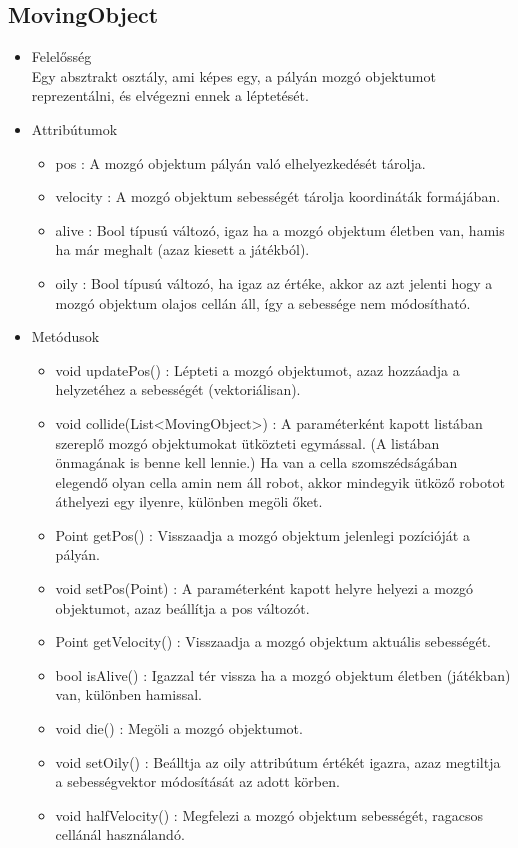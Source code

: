\subsection{MovingObject}
\begin{itemize}
	\item Felelősség\\
	Egy absztrakt osztály, ami képes egy, a pályán mozgó objektumot reprezentálni, és elvégezni ennek a léptetését.
	\item Attribútumok
	\begin{itemize}
		\item pos : A mozgó objektum  pályán való elhelyezkedését tárolja.
		\item velocity : A mozgó objektum sebességét tárolja koordináták formájában.
		\item alive : Bool típusú változó, igaz ha a mozgó objektum életben van, hamis ha már meghalt (azaz kiesett a játékból).
		\item oily : Bool típusú változó, ha igaz az értéke, akkor az azt jelenti hogy a mozgó objektum olajos cellán áll, így a sebessége nem módosítható.
	\end{itemize}
	\item Metódusok
	\begin{itemize}
		\item void updatePos() : Lépteti a mozgó objektumot, azaz hozzáadja a helyzetéhez a sebességét (vektoriálisan).
		\item void collide(List<MovingObject>) : A paraméterként kapott listában szereplő mozgó objektumokat ütközteti egymással. (A listában önmagának is benne kell lennie.) Ha van a cella szomszédságában elegendő olyan cella amin nem áll robot, akkor mindegyik ütköző robotot áthelyezi egy ilyenre, különben megöli őket.
		\item Point getPos() : Visszaadja a mozgó objektum jelenlegi pozícióját a pályán.
		\item void setPos(Point) : A paraméterként kapott helyre helyezi a mozgó objektumot, azaz beállítja a pos változót.
		\item Point getVelocity() : Visszaadja a mozgó objektum aktuális sebességét.
		\item bool isAlive() : Igazzal tér vissza ha a mozgó objektum életben (játékban) van, különben hamissal.
		\item void die() : Megöli a mozgó objektumot.
		\item void setOily() : Beálltja az oily attribútum értékét igazra, azaz megtiltja a sebességvektor módosítását az adott körben.
		\item void halfVelocity() : Megfelezi a mozgó objektum sebességét, ragacsos cellánál használandó.
	\end{itemize}
\end{itemize}


